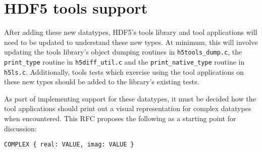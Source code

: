 \documentclass[../HDF5_RFC.tex]{subfiles}
\begin{document}
\section{HDF5 tools support}
\label{tools}

After adding these new datatypes, HDF5's tools library and tool applications will need to be
updated to understand these new types. At minimum, this will involve updating the tools library's
object dumping routines in \texttt{h5tools\_dump.c}, the \texttt{print\_type} routine in
\texttt{h5diff\_util.c} and the \texttt{print\_native\_type} routine in \texttt{h5ls.c}.
Additionally, tools tests which exercise using the tool applications on these new types should be
added to the library's existing tests.

As part of implementing support for these datatypes, it must be decided how the tool applications
should print out a visual representation for complex datatypes when encountered. This RFC proposes
the following as a starting point for discussion:

\begin{verbatim}
COMPLEX { real: VALUE, imag: VALUE }    
\end{verbatim}
\end{document}
